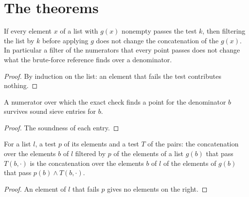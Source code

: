 \section{The theorems}\label{sec:sieveTheorems}

\begin{lemma}\label{lem:flatMap_sound}
  \leanok
  If every element $x$ of a list with $g(x)$ nonempty passes the test $k$, then filtering the
  list by $k$ before applying $g$ does not change the concatenation of the $g(x)$. In particular a
  filter of the numerators that every point passes does not change what the brute-force reference
  finds over a denominator.
\end{lemma}

\begin{proof}
  \leanok
  By induction on the list: an element that fails the test contributes nothing.
\end{proof}

\begin{lemma}\label{lem:survives}
  \leanok
  A numerator over which the exact check finds a point for the denominator $b$ survives sound sieve
  entries for $b$.
\end{lemma}

\begin{proof}
  \leanok
  The soundness of each entry.
\end{proof}

\begin{lemma}\label{lem:flatMapFilter}
  \leanok
  For a list $l$, a test $p$ of its elements and a test $T$ of the pairs: the concatenation over the
  elements $b$ of $l$ filtered by $p$ of the elements of a list $g(b)$ that pass $T(b, \cdot)$ is
  the concatenation over the elements $b$ of $l$ of the elements of $g(b)$ that pass
  $p(b) \wedge T(b, \cdot)$.
\end{lemma}

\begin{proof}
  \leanok
  An element of $l$ that fails $p$ gives no elements on the right.
\end{proof}

